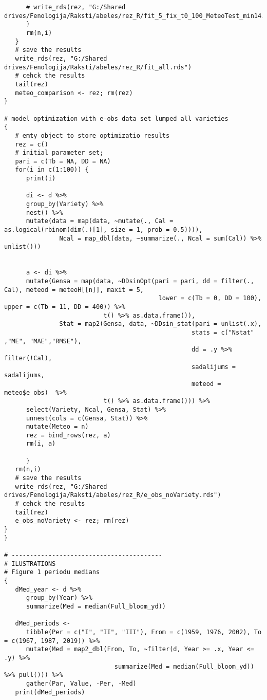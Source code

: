 \begin{verbatim}
      # write_rds(rez, "G:/Shared drives/Fenologija/Raksti/abeles/rez_R/fit_5_fix_t0_100_MeteoTest_min14.rds")
      }
      rm(n,i)
   }
   # save the results
   write_rds(rez, "G:/Shared drives/Fenologija/Raksti/abeles/rez_R/fit_all.rds")
   # cehck the results
   tail(rez)
   meteo_comparison <- rez; rm(rez)
}

# model optimization with e-obs data set lumped all varieties
{
   # emty object to store optimizatio results
   rez = c()
   # initial parameter set;
   pari = c(Tb = NA, DD = NA)
   for(i in c(1:100)) {
      print(i)

      di <- d %>%
      group_by(Variety) %>%
      nest() %>%
      mutate(data = map(data, ~mutate(., Cal = as.logical(rbinom(dim(.)[1], size = 1, prob = 0.5)))),
               Ncal = map_dbl(data, ~summarize(., Ncal = sum(Cal)) %>% unlist()))


      a <- di %>%
      mutate(Gensa = map(data, ~DDsinOpt(pari = pari, dd = filter(., Cal), meteod = meteoH[[n]], maxit = 5,
                                          lower = c(Tb = 0, DD = 100), upper = c(Tb = 11, DD = 400)) %>%
                           t() %>% as.data.frame()),
               Stat = map2(Gensa, data, ~DDsin_stat(pari = unlist(.x),
                                                   stats = c("Nstat" ,"ME", "MAE","RMSE"),
                                                   dd = .y %>% filter(!Cal),
                                                   sadalijums = sadalijums,
                                                   meteod = meteo$e_obs)  %>%
                           t() %>% as.data.frame())) %>%
      select(Variety, Ncal, Gensa, Stat) %>%
      unnest(cols = c(Gensa, Stat)) %>%
      mutate(Meteo = n)
      rez = bind_rows(rez, a)
      rm(i, a)

      }
   rm(n,i)
   # save the results
   write_rds(rez, "G:/Shared drives/Fenologija/Raksti/abeles/rez_R/e_obs_noVariety.rds")
   # cehck the results
   tail(rez)
   e_obs_noVariety <- rez; rm(rez)
}
}

# -----------------------------------------
# ILUSTRATIONS
# Figure 1 periodu medians
{
   dMed_year <- d %>%
      group_by(Year) %>%
      summarize(Med = median(Full_bloom_yd))

   dMed_periods <-
      tibble(Per = c("I", "II", "III"), From = c(1959, 1976, 2002), To = c(1967, 1987, 2019)) %>%
      mutate(Med = map2_dbl(From, To, ~filter(d, Year >= .x, Year <= .y) %>%
                              summarize(Med = median(Full_bloom_yd)) %>% pull())) %>%
      gather(Par, Value, -Per, -Med)
   print(dMed_periods)


\end{verbatim}
